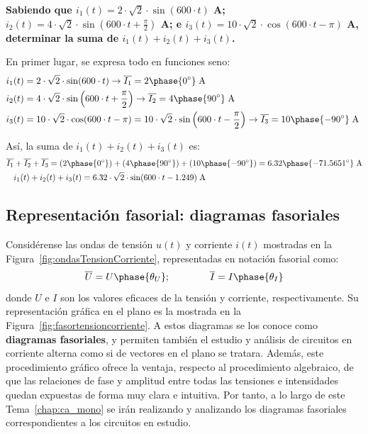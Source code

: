 \vspace{4mm}
\begin{example}
  \textbf{Sabiendo que $i_1(t)=2\cdot\sqrt{2}\cdot \sin(600\cdot t)$
    A;
    $i_2(t)=4\cdot\sqrt{2}\cdot \sin\left(600\cdot
      t+\frac{\pi}{2}\right)$ A; e
    $i_3(t)=10\cdot\sqrt{2}\cdot \cos(600\cdot t-\pi)$ A, determinar
    la suma de $i_1(t)+i_2(t)+i_3(t)$.}
		
  En primer lugar, se expresa todo en funciones seno:
  \begin{align*}
    i_1(t)&=2\cdot\sqrt{2}\cdot \sin(600\cdot t)\rightarrow \overline{I_1}=2\phase{0^\circ}\;\text{A}\\
    i_2(t)&=4\cdot\sqrt{2}\cdot \sin\left(600\cdot t+\frac{\pi}{2}\right)\rightarrow \overline{I_2}=4\phase{90^\circ}\;\text{A}\\
    i_3(t)&=10\cdot\sqrt{2}\cdot \cos(600\cdot t-\pi)=10\cdot\sqrt{2}\cdot \sin\left(600\cdot t-\frac{\pi}{2}\right)\rightarrow \overline{I_3}=10\phase{-90^\circ}\;\text{A}\
  \end{align*}
		
  Así, la suma de $i_1(t)+i_2(t)+i_3(t)$ es:
  \begin{align*}
    \overline{I_1}&+\overline{I_2}+\overline{I_3}=(2\phase{0^\circ})+(4\phase{90^\circ})+(10\phase {-90^\circ})=6.32\phase{-71.5651^\circ}\;\text{A} \\
                  &i_1(t)+i_2(t)+i_3(t)=6.32\cdot\sqrt{2}\cdot \sin(600\cdot t-1.249)\;\text{A}
  \end{align*}
\end{example}
	
\subsection{Representación fasorial: diagramas fasoriales}
	
Considérense las ondas de tensión $u(t)$ y corriente $i(t)$ mostradas
en la Figura~\ref{fig:ondasTensionCorriente}, representadas en
notación fasorial como:
\begin{equation*}
  \overline{U} = U\phase{\theta_U};\qquad\qquad   \overline{I} = I\phase{\theta_I}
\end{equation*}
donde $U$ e $I$ son los valores eficaces de la tensión y corriente,
respectivamente. Su representación gráfica en el plano es la mostrada
en la Figura~\ref{fig:fasortensioncorriente}. A estos diagramas se los
conoce como \textbf{diagramas fasoriales}, y permiten también el
estudio y análisis de circuitos en corriente alterna como si de
vectores en el plano se tratara. Además, este procedimiento gráfico
ofrece la ventaja, respecto al procedimiento algebraico, de que las
relaciones de fase y amplitud entre todas las tensiones e intensidades
quedan expuestas de forma muy clara e intuitiva. Por tanto, a lo largo
de este Tema~\ref{chap:ca_mono} se irán realizando y analizando los
diagramas fasoriales correspondientes a los circuitos en estudio.
	
